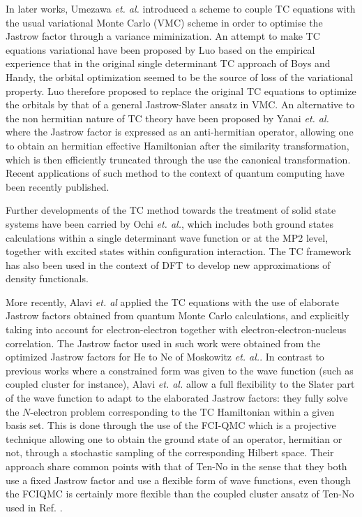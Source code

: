 \documentclass[aip,jcp,reprint,noshowkeys,superscriptaddress]{revtex4-1}
\begin{document}
In later works, Umezawa \textit{et. al.}\cite{UmeTsu-JCP-03,UmeTsuOhnShiChi-JCP-05} introduced a scheme to couple TC equations with the usual variational Monte Carlo (VMC) scheme in order to optimise the Jastrow factor through a variance miminization. 
An attempt to make TC equations variational have been proposed by Luo\cite{Luo-JCP-10,Luo-JCP-11} based on the empirical experience that in the original single determinant TC approach of Boys and Handy, the orbital optimization seemed to be the source of loss of the variational property. Luo therefore proposed to replace the original TC equations to optimize the orbitals by that of a general Jastrow-Slater ansatz in VMC. 
An alternative to the non hermitian nature of TC theory have been proposed by Yanai \textit{et. al.}\cite{YanShi-JCP-12}  where the Jastrow factor is expressed as an anti-hermitian operator, allowing one to obtain an hermitian effective Hamiltonian after the similarity transformation, which is then efficiently truncated through the use the canonical transformation\cite{NeuYanCha-MolPhys-10}. Recent applications of such method to the context of quantum computing have been recently published\cite{ValTak-PCCP-20}. 

Further developments of the TC method towards the treatment of solid state systems have been carried by Ochi \textit{et. al.}\cite{OchSodSakTsu-JCP-12,OchTsu-JCTC-14,OchTsu-CPL-15,OchYamAriTsu-JCP-16}, which includes both ground states calculations within a single determinant wave function \cite{OchSodSakTsu-JCP-12,OchYamAriTsu-JCP-16} or at the MP2 level\cite{OchTsu-CPL-15}, together with excited states within configuration interaction\cite{OchTsu-JCTC-14}. 
The TC framework has also been used in the context of DFT to develop new approximations of density functionals\cite{ImaScu-JCP-03,UmeChi-PRA-06,Umezawa-JCP-17}. 

More recently, Alavi \textit{et. al}\cite{CohLuoGutDobTewAla-JCP-19} applied the TC equations with the use of elaborate Jastrow factors obtained from quantum Monte Carlo calculations, and explicitly taking into account for electron-electron together with electron-electron-nucleus correlation. The Jastrow factor used in such work were obtained from the optimized Jastrow factors for He to Ne of Moskowitz \textit{et. al.}\cite{SchMos-JCP-90}. 
In contrast to previous works where a constrained form was given to the wave function (such as coupled cluster for instance\cite{HinTanTen-CPL-02}),  Alavi \textit{et. al.} allow a full flexibility to the Slater part of the wave function to adapt to the elaborated Jastrow factors: they fully solve the $N$-electron problem corresponding to the TC Hamiltonian within a given basis set. 
This is done through the use of the FCI-QMC\cite{BooThoAla-JCP-09,BooAla-JCP-10,BooCleThoAla-JCP-11,GhaLozAla-JCP-19,VitAlaKat-JCTC-20} which is a projective technique allowing one to obtain the ground state of an operator, hermitian or not, through a stochastic sampling of the corresponding Hilbert space. Their approach share common points with that of Ten-No in the sense that they both use a fixed Jastrow factor and use a flexible form of wave functions, 
even though the FCIQMC is certainly more flexible than the coupled cluster ansatz of Ten-No used in Ref. . 
\end{document}

